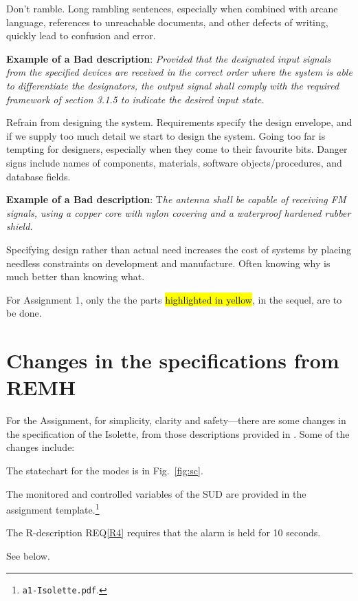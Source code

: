 \bigskip
Don't ramble. Long rambling sentences, especially when combined with arcane language,
references to unreachable documents, and other defects of writing, quickly lead
to confusion and error.

\textbf{Example of a Bad description}:
\emph{Provided that the designated input signals from the specified devices are received
in the correct order where the system is able to differentiate the designators, the
output signal shall comply with the required framework of section 3.1.5 to
indicate the desired input state.}

\bigskip
Refrain from designing the system. Requirements specify the design envelope, and if we supply too much detail we
start to design the system. Going too far is tempting for designers, especially
when they come to their favourite bits. Danger signs include names of
components, materials, software objects/procedures, and database fields.

\textbf{Example of a Bad description}:
T\emph{he antenna shall be capable of receiving FM signals, using a copper core with
nylon covering and a waterproof hardened rubber shield.}

Specifying design rather than actual need increases the cost of systems by placing
needless constraints on development and manufacture. Often knowing why is
much better than knowing what.

For Assignment 1, only the the parts \hl{highlighted in yellow}, in the sequel,  are to be done.

\section{Changes in the specifications from  REMH \cite{REMH}}

For the Assignment,  for simplicity, clarity and safety---there are some changes in the specification of the Isolette,  from those descriptions provided in \cite{REMH}. Some of the changes include:

\begin{mylist}
\item The statechart for the modes is in Fig.~\ref{fig:sc}.
\item The monitored and controlled variables of the SUD are provided in the assignment template.\footnote{\texttt{a1-Isolette.pdf}.}
\item The R-description REQ\ref{R4} requires that the alarm is held for 10 seconds.
\item See below.
\end{mylist}

